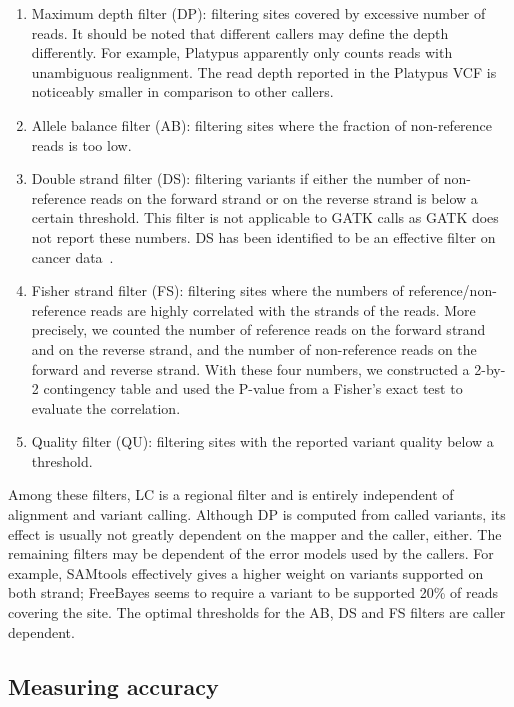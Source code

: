 \documentclass{bioinfo}
\begin{document}
\begin{methods}
\begin{enumerate}
\item Maximum depth filter (DP): filtering sites covered by excessive number of
reads. It should be noted that different callers may define the depth
differently. For example, Platypus apparently only counts reads with
unambiguous realignment. The read depth reported in the Platypus VCF is
noticeably smaller in comparison to other callers.

\item Allele balance filter (AB): filtering sites where the fraction of
non-reference reads is too low.

\item Double strand filter (DS): filtering variants if either the number of
non-reference reads on the forward strand or on the reverse strand is below a
certain threshold. This filter is not applicable to GATK calls as GATK does not
report these numbers. DS has been identified to be an effective filter on
cancer data~\citep{Roberts:2013aa,Kim:2013aa}.

\item Fisher strand filter (FS): filtering sites where the numbers of
reference/non-reference reads are highly correlated with the strands of the
reads. More precisely, we counted the number of reference reads on the forward
strand and on the reverse strand, and the number of non-reference reads on the
forward and reverse strand. With these four numbers, we constructed a 2-by-2
contingency table and used the P-value from a Fisher's exact test to evaluate
the correlation.

\item Quality filter (QU): filtering sites with the reported variant quality
below a threshold.

\end{enumerate}

Among these filters, LC is a regional filter and is entirely independent of
alignment and variant calling. Although DP is computed from called
variants, its effect is usually not greatly dependent on the mapper and the caller,
either. The remaining filters may be dependent of the error models used by the
callers. For example, SAMtools effectively gives a higher weight on variants
supported on both strand; FreeBayes seems to require a variant to be supported
20\% of reads covering the site. The optimal thresholds for the AB, DS and FS
filters are caller dependent.

\subsection{Measuring accuracy}


\end{methods}
\end{document}
